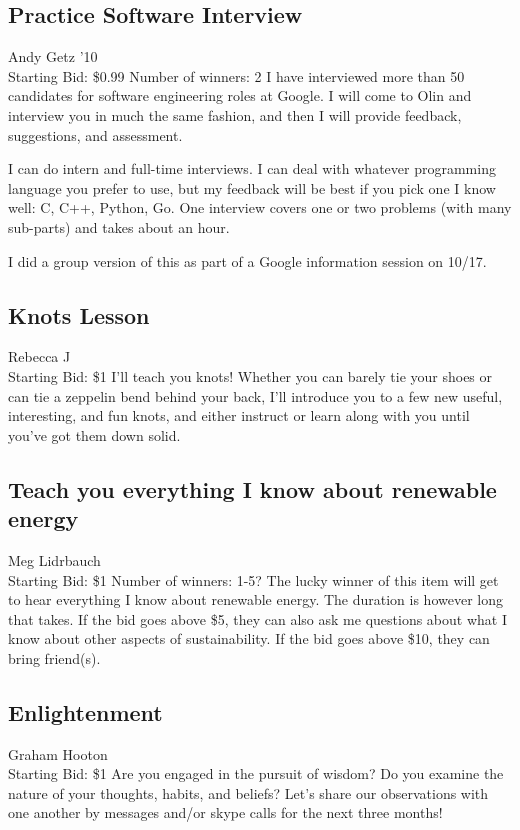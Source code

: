 \documentclass[11pt]{article}
\begin{document}
\subsection{Practice Software Interview}
Andy Getz '10
\\
Starting Bid: \$0.99
\newline
Number of winners: 2
\newline
I have interviewed more than 50 candidates for software engineering roles at Google.  I will come to Olin and interview you in much the same fashion, and then I will provide feedback, suggestions, and assessment.

I can do intern and full-time interviews.  I can deal with whatever programming language you prefer to use, but my feedback will be best if you pick one I know well: C, C++, Python, Go.  One interview covers one or two problems (with many sub-parts) and takes about an hour.

I did a group version of this as part of a Google information session on 10/17.
\subsection{Knots Lesson}
Rebecca J
\\
Starting Bid: \$1
\newline
I'll teach you knots! Whether you can barely tie your shoes or can tie a zeppelin bend behind your back, I'll introduce you to a few new useful, interesting, and fun knots, and either instruct or learn along with you until you've got them down solid.
\subsection{Teach you everything I know about renewable energy}
Meg Lidrbauch
\\
Starting Bid: \$1
\newline
Number of winners: 1-5?
\newline
The lucky winner of this item will get to hear everything I know about renewable energy. The duration is however long that takes. If the bid goes above \$5, they can also ask me questions about what I know about other aspects of sustainability. If the bid goes above \$10, they can bring friend(s).
\subsection{Enlightenment}
Graham Hooton
\\
Starting Bid: \$1
\newline
Are you engaged in the pursuit of wisdom? Do you examine the nature of your thoughts, habits, and beliefs? Let's share our observations with one another by messages and/or skype calls for the next three months!
\end{document}
